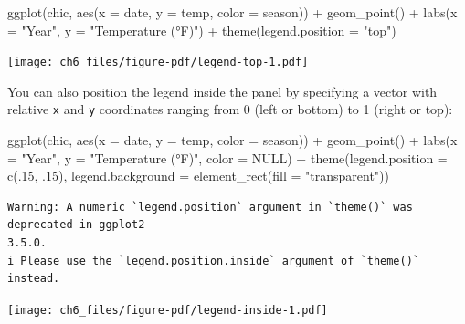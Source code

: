 \documentclass[
  letterpaper,
  DIV=11,
  numbers=noendperiod]{scrreprt}
\newenvironment{Shaded}{\begin{snugshade}}{\end{snugshade}}
\newcommand{\AttributeTok}[1]{\textcolor[rgb]{0.40,0.45,0.13}{#1}}
\newcommand{\ConstantTok}[1]{\textcolor[rgb]{0.56,0.35,0.01}{#1}}
\newcommand{\DecValTok}[1]{\textcolor[rgb]{0.68,0.00,0.00}{#1}}
\newcommand{\FunctionTok}[1]{\textcolor[rgb]{0.28,0.35,0.67}{#1}}
\newcommand{\NormalTok}[1]{\textcolor[rgb]{0.00,0.23,0.31}{#1}}
\newcommand{\SpecialCharTok}[1]{\textcolor[rgb]{0.37,0.37,0.37}{#1}}
\newcommand{\StringTok}[1]{\textcolor[rgb]{0.13,0.47,0.30}{#1}}
\begin{document}
\begin{Shaded}
\begin{Highlighting}[]
\FunctionTok{ggplot}\NormalTok{(chic, }\FunctionTok{aes}\NormalTok{(}\AttributeTok{x =}\NormalTok{ date, }\AttributeTok{y =}\NormalTok{ temp, }\AttributeTok{color =}\NormalTok{ season)) }\SpecialCharTok{+}
  \FunctionTok{geom\_point}\NormalTok{() }\SpecialCharTok{+}
  \FunctionTok{labs}\NormalTok{(}\AttributeTok{x =} \StringTok{"Year"}\NormalTok{, }\AttributeTok{y =} \StringTok{"Temperature (°F)"}\NormalTok{) }\SpecialCharTok{+}
  \FunctionTok{theme}\NormalTok{(}\AttributeTok{legend.position =} \StringTok{"top"}\NormalTok{)}
\end{Highlighting}
\end{Shaded}

\texttt{[image: ch6\_files/figure-pdf/legend-top-1.pdf]}

You can also position the legend inside the panel by specifying a vector
with relative \texttt{x} and \texttt{y} coordinates ranging from 0 (left
or bottom) to 1 (right or top):

\begin{Shaded}
\begin{Highlighting}[]
\FunctionTok{ggplot}\NormalTok{(chic, }\FunctionTok{aes}\NormalTok{(}\AttributeTok{x =}\NormalTok{ date, }\AttributeTok{y =}\NormalTok{ temp, }\AttributeTok{color =}\NormalTok{ season)) }\SpecialCharTok{+}
  \FunctionTok{geom\_point}\NormalTok{() }\SpecialCharTok{+}
  \FunctionTok{labs}\NormalTok{(}\AttributeTok{x =} \StringTok{"Year"}\NormalTok{, }\AttributeTok{y =} \StringTok{"Temperature (°F)"}\NormalTok{,}
       \AttributeTok{color =} \ConstantTok{NULL}\NormalTok{) }\SpecialCharTok{+}
  \FunctionTok{theme}\NormalTok{(}\AttributeTok{legend.position =} \FunctionTok{c}\NormalTok{(.}\DecValTok{15}\NormalTok{, .}\DecValTok{15}\NormalTok{),}
        \AttributeTok{legend.background =} \FunctionTok{element\_rect}\NormalTok{(}\AttributeTok{fill =} \StringTok{"transparent"}\NormalTok{))}
\end{Highlighting}
\end{Shaded}

\begin{verbatim}
Warning: A numeric `legend.position` argument in `theme()` was deprecated in ggplot2
3.5.0.
i Please use the `legend.position.inside` argument of `theme()` instead.
\end{verbatim}

\texttt{[image: ch6\_files/figure-pdf/legend-inside-1.pdf]}
\end{document}

